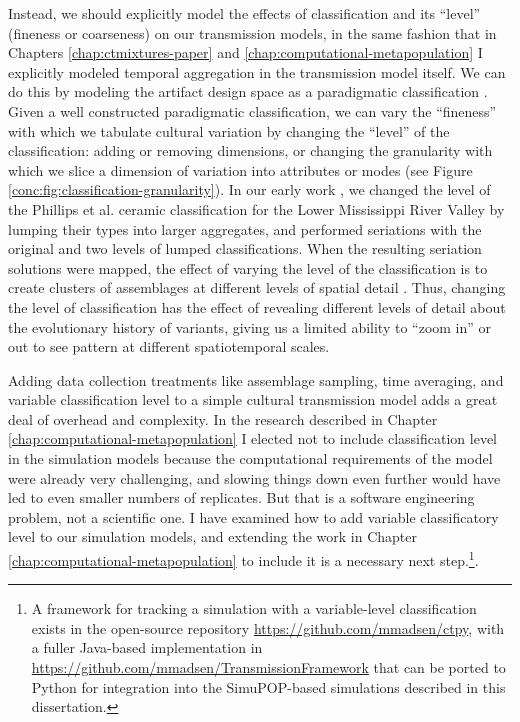 Instead, we should  explicitly model the effects of classification and its ``level'' (fineness or coarseness) on our transmission models, in the same fashion that in Chapters \ref{chap:ctmixtures-paper} and \ref{chap:computational-metapopulation} I explicitly modeled temporal aggregation in the transmission model itself.  We can do this by  modeling the artifact design space as a paradigmatic classification \citep{Dunnell1971,OBrien2015}.  Given a well constructed paradigmatic classification, we can vary the ``fineness'' with which we tabulate cultural variation by changing the ``level'' of the classification:  adding or removing dimensions, or changing the granularity with which we slice a dimension of variation into attributes or modes (see Figure \ref{conc:fig:classification-granularity}).  In our early work \citep{Lipo1997}, we changed the level of the Phillips et al. ceramic classification for the Lower Mississippi River Valley by lumping their types into larger aggregates, and performed seriations with the original and two levels of lumped classifications.  When the resulting seriation solutions were mapped, the effect of varying the level of the classification is to create clusters of assemblages at different levels of spatial detail \citep[Fig. 17]{Lipo1997}.  Thus, changing the level of classification has the effect of revealing different levels of detail about the evolutionary history of variants, giving us a limited ability to ``zoom in'' or out to see pattern at different spatiotemporal scales.

Adding data collection treatments like assemblage sampling, time averaging, and variable classification level to a simple cultural transmission model adds a great deal of overhead and complexity.  In the research described in Chapter \ref{chap:computational-metapopulation} I elected not to include classification level in the simulation models because the computational requirements of the model were already very challenging, and slowing things down even further would have led to even smaller numbers of replicates.  But that is a software engineering problem, not a scientific one.  I have examined how to add variable classificatory level to our simulation models, and extending the work in Chapter \ref{chap:computational-metapopulation} to include it is a necessary next step.\footnote{A framework for tracking a simulation with a variable-level classification exists in the open-source repository \url{https://github.com/mmadsen/ctpy}, with a fuller Java-based implementation in \url{https://github.com/mmadsen/TransmissionFramework} that can be ported to Python for integration into the SimuPOP-based simulations described in this dissertation.}.


